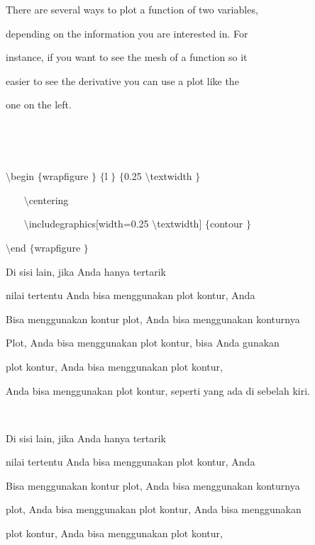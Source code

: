 \noindent 
There are several ways to plot a function of two variables,  \par
\noindent 
depending on the information you are interested in. For  \par
\noindent 
instance, if you want to see the mesh of a function so it  \par
\noindent 
easier to see the derivative you can use a plot like the  \par
\noindent 
one on the left. \par
\noindent 
 $  $ \par
\noindent 
 $  $ \par
\noindent 
 $  \setminus $begin $  \{  $wrapfigure $  \}  $ $  \{  $l $  \}  $ $  \{  $0.25 $  \setminus $textwidth $  \}  $ \par
\vspace{12pt}
\noindent 
~~~  $  \setminus $centering \par
\vspace{12pt}
\noindent 
~~~  $  \setminus $includegraphics[width=0.25 $  \setminus $textwidth] $  \{  $contour $  \}  $ \par
\vspace{12pt}
\noindent 
 $  \setminus $end $  \{  $wrapfigure $  \}  $ \par
\vspace{22pt}
\noindent 
Di sisi lain, jika Anda hanya tertarik \par
\noindent 
nilai tertentu Anda bisa menggunakan plot kontur, Anda \par
\noindent 
Bisa menggunakan kontur plot, Anda bisa menggunakan konturnya \par
\noindent 
Plot, Anda bisa menggunakan plot kontur, bisa Anda gunakan \par
\noindent 
plot kontur, Anda bisa menggunakan plot kontur, \par
\noindent 
Anda bisa menggunakan plot kontur, seperti yang ada di sebelah kiri. \par
\noindent 
 $  $ \par
\noindent 
Di sisi lain, jika Anda hanya tertarik \par
\noindent 
nilai tertentu Anda bisa menggunakan plot kontur, Anda \par
\noindent 
Bisa menggunakan kontur plot, Anda bisa menggunakan konturnya \par
\noindent 
plot, Anda bisa menggunakan plot kontur, Anda bisa menggunakan \par
\noindent 
plot kontur, Anda bisa menggunakan plot kontur, \par
